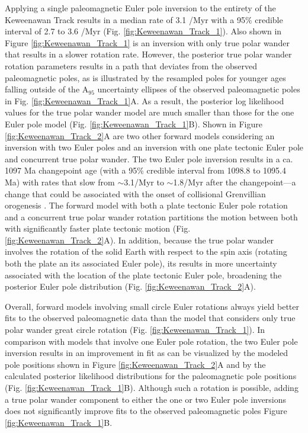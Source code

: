 \documentclass[11pt,letterpaper]{article}
\begin{document}
Applying a single paleomagnetic Euler pole inversion to the entirety of the Keweenawan Track results in a median rate of 3.1 \textdegree/Myr with a 95$\%$ credible interval of 2.7 to 3.6 \textdegree/Myr (Fig. \ref{fig:Keweenawan_Track_1}). Also shown in Figure \ref{fig:Keweenawan_Track_1} is an inversion with only true polar wander that results in a slower rotation rate. However, the posterior true polar wander rotation parameters results in a path that deviates from the observed paleomagnetic poles, as is illustrated by the resampled poles for younger ages falling outside of the A$_95$ uncertainty ellipses of the observed paleomagnetic poles in Fig. \ref{fig:Keweenawan_Track_1}A. As a result, the posterior log likelihood values for the true polar wander model are much smaller than those for the one Euler pole model (Fig. \ref{fig:Keweenawan_Track_1}B). Shown in Figure \ref{fig:Keweenawan_Track_2}A are two other forward models considering an inversion with two Euler poles and an inversion with one plate tectonic Euler pole and concurrent true polar wander. The two Euler pole inversion results in a ca. 1097 Ma changepoint age (with a 95\% credible interval from 1098.8 to 1095.4 Ma) with rates that slow from $\sim$3.1\textdegree /Myr to $\sim$1.8\textdegree /Myr after the changepoint---a change that could be associated with the onset of collisional Grenvillian orogenesis \citep{Swanson-Hysell2019a}. The forward model with both a plate tectonic Euler pole rotation and a concurrent true polar wander rotation partitions the motion between both with significantly faster plate tectonic motion (Fig. \ref{fig:Keweenawan_Track_2}A). In addition, because the true polar wander involves the rotation of the solid Earth with respect to the spin axis (rotating both the plate an its associated Euler pole), its results in more uncertainty associated with the location of the plate tectonic Euler pole, broadening the posterior Euler pole distribution (Fig. \ref{fig:Keweenawan_Track_2}A).

Overall, forward models involving small circle Euler rotations always yield better fits to the observed paleomagnetic data than the model that considers only true polar wander great circle rotation (Fig. \ref{fig:Keweenawan_Track_1}). In comparison with models that involve one Euler pole rotation, the two Euler pole inversion results in an improvement in fit as can be visualized by the modeled pole positions shown in Figure \ref{fig:Keweenawan_Track_2}A and by the calculated posterior likelihood distributions for the paleomagnetic pole positions (Fig. \ref{fig:Keweenawan_Track_1}B). Although such a rotation is possible, adding a true polar wander component to either the one or two Euler pole inversions does not significantly improve fits to the observed paleomagnetic poles Figure \ref{fig:Keweenawan_Track_1}B. 
\end{document}
